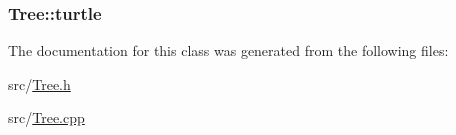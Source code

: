 \subsubsection[{\texorpdfstring{turtle}{turtle}}]{ Tree\+::turtle\hspace{0.3cm}{\ttfamily [protected]}}\hypertarget{class_tree_a3eb5b35677be3847ed46da046564cf4c}{}\label{class_tree_a3eb5b35677be3847ed46da046564cf4c}


The documentation for this class was generated from the following files\+:\begin{DoxyCompactItemize}
\item 
src/\hyperlink{_tree_8h}{Tree.\+h}\item 
src/\hyperlink{_tree_8cpp}{Tree.\+cpp}\end{DoxyCompactItemize}
